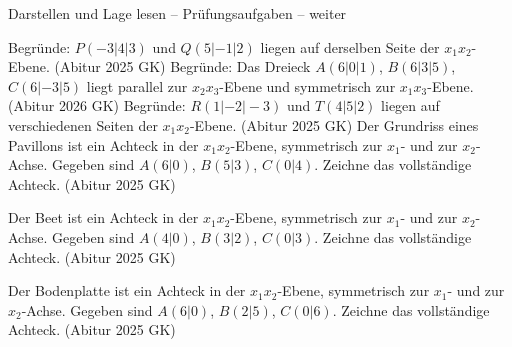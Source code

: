 \begin{aufgabe}{Darstellen und Lage lesen – Prüfungsaufgaben – weiter}
\begin{teile}
\teil Begründe: $P(-3 | 4 | 3)$ und $Q(5 | -1 | 2)$ liegen auf derselben Seite der $x_1x_2$-Ebene. \hfill (Abitur 2025 GK)
\teil Begründe: Das Dreieck $A(6 | 0 | 1)$, $B(6 | 3 | 5)$, $C(6 | -3 | 5)$ liegt parallel zur $x_2x_3$-Ebene und symmetrisch zur $x_1x_3$-Ebene. \hfill (Abitur 2026 GK)
\teil Begründe: $R(1 | -2 | -3)$ und $T(4 | 5 | 2)$ liegen auf verschiedenen Seiten der $x_1x_2$-Ebene. \hfill (Abitur 2025 GK)
\teil Der Grundriss eines Pavillons ist ein Achteck in der $x_1x_2$-Ebene, symmetrisch zur $x_1$- und zur $x_2$-Achse. Gegeben sind $A(6 | 0)$, $B(5 | 3)$, $C(0 | 4)$. Zeichne das vollständige Achteck. \hfill (Abitur 2025 GK)

\begin{ksys}[xmin=-7,xmax=7,ymin=-7,ymax=7,xlabel=$x_1$,ylabel=$x_2$]    \end{ksys}
\teil Der Beet ist ein Achteck in der $x_1x_2$-Ebene, symmetrisch zur $x_1$- und zur $x_2$-Achse. Gegeben sind $A(4 | 0)$, $B(3 | 2)$, $C(0 | 3)$. Zeichne das vollständige Achteck. \hfill (Abitur 2025 GK)

\begin{ksys}[xmin=-7,xmax=7,ymin=-7,ymax=7,xlabel=$x_1$,ylabel=$x_2$]    \end{ksys}
\teil Der Bodenplatte ist ein Achteck in der $x_1x_2$-Ebene, symmetrisch zur $x_1$- und zur $x_2$-Achse. Gegeben sind $A(6 | 0)$, $B(2 | 5)$, $C(0 | 6)$. Zeichne das vollständige Achteck. \hfill (Abitur 2025 GK)

\begin{ksys}[xmin=-7,xmax=7,ymin=-7,ymax=7,xlabel=$x_1$,ylabel=$x_2$]    \end{ksys}
\end{teile}
\end{aufgabe}

